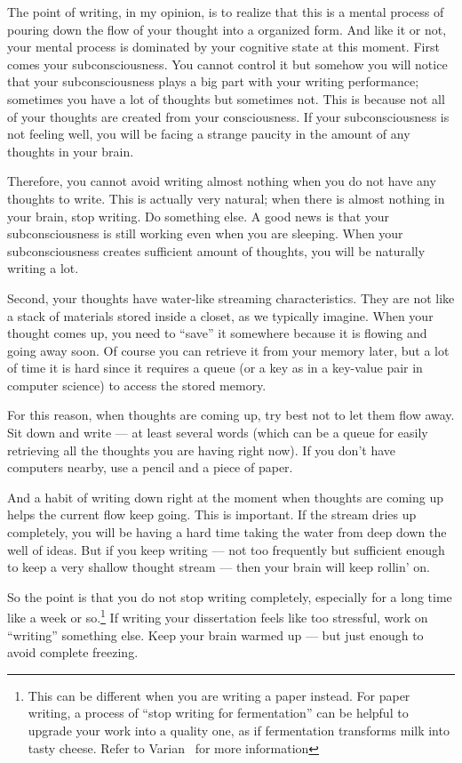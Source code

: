 \documentclass[11pt]{article}
\begin{document}
The point of writing, in my opinion, is to realize that this is a mental
process of pouring down the flow of your thought into a organized form.  And
like it or not, your mental process is dominated by your cognitive state at
this moment. First comes your subconsciousness. You cannot control it but
somehow you will notice that your subconsciousness plays a big part with your
writing performance; sometimes you have a lot of thoughts but sometimes not.
This is because not all of your thoughts are created from your consciousness.
If your subconsciousness is not feeling well, you will be facing a strange
paucity in the amount of any thoughts in your brain.

Therefore, you cannot avoid writing almost nothing when you do not have any
thoughts to write. This is actually very natural; when there is almost nothing
in your brain, stop writing. Do something else. A good news is that your
subconsciousness is still working even when you are sleeping.  When your
subconsciousness creates sufficient amount of thoughts, you will be naturally
writing a lot. 

Second, your thoughts have water-like streaming characteristics.  They are not
like a stack of materials stored inside a closet, as we typically imagine.
When your thought comes up, you need to ``save'' it somewhere because it is
flowing and going away soon.  Of course you can retrieve it from your memory
later, but a lot of time it is hard since it requires a queue (or a key as in
a key-value pair in computer science) to access the stored memory.

For this reason, when thoughts are coming up, try best not to let them flow
away. Sit down and write --- at least several words (which can be a queue for
easily retrieving all the thoughts you are having right now). If you don't
have computers nearby, use a pencil and a piece of paper. 

And a habit of writing down right at the moment when thoughts are coming up
helps the current flow keep going. This is important. If the stream dries up
completely, you will be having a hard time taking the water from deep down the
well of ideas.  But if you keep writing --- not too frequently but sufficient
enough to keep a very shallow thought stream --- then your brain will keep
rollin' on.

So the point is that you do not stop writing completely, especially for a long
time like a week or so.\footnote{This can be different when you
    are writing a paper instead. For paper writing, a process of ``stop
    writing for fermentation'' can be helpful to upgrade your work into a
quality one, as if fermentation transforms milk into tasty cheese. Refer to
Varian~\cite{varian-building-model} for more information} If writing your dissertation feels like
too stressful, work on ``writing'' something else. Keep your brain warmed up
--- but just enough to avoid complete freezing. 
\end{document}
